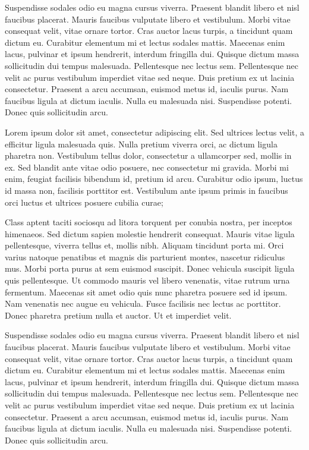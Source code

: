Suspendisse sodales odio eu magna cursus viverra. Praesent blandit libero et nisl faucibus placerat. Mauris faucibus vulputate libero et vestibulum. Morbi vitae consequat velit, vitae ornare tortor. Cras auctor lacus turpis, a tincidunt quam dictum eu. Curabitur elementum mi et lectus sodales mattis. Maecenas enim lacus, pulvinar et ipsum hendrerit, interdum fringilla dui. Quisque dictum massa sollicitudin dui tempus malesuada. Pellentesque nec lectus sem. Pellentesque nec velit ac purus vestibulum imperdiet vitae sed neque. Duis pretium ex ut lacinia consectetur. Praesent a arcu accumsan, euismod metus id, iaculis purus. Nam faucibus ligula at dictum iaculis. Nulla eu malesuada nisi. Suspendisse potenti. Donec quis sollicitudin arcu.

Lorem ipsum dolor sit amet, consectetur adipiscing elit. Sed ultrices lectus velit, a efficitur ligula malesuada quis. Nulla pretium viverra orci, ac dictum ligula pharetra non. Vestibulum tellus dolor, consectetur a ullamcorper sed, mollis in ex. Sed blandit ante vitae odio posuere, nec consectetur mi gravida. Morbi mi enim, feugiat facilisis bibendum id, pretium id arcu. Curabitur odio ipsum, luctus id massa non, facilisis porttitor est. Vestibulum ante ipsum primis in faucibus orci luctus et ultrices posuere cubilia curae;

Class aptent taciti sociosqu ad litora torquent per conubia nostra, per inceptos himenaeos. Sed dictum sapien molestie hendrerit consequat. Mauris vitae ligula pellentesque, viverra tellus et, mollis nibh. Aliquam tincidunt porta mi. Orci varius natoque penatibus et magnis dis parturient montes, nascetur ridiculus mus. Morbi porta purus at sem euismod suscipit. Donec vehicula suscipit ligula quis pellentesque. Ut commodo mauris vel libero venenatis, vitae rutrum urna fermentum. Maecenas sit amet odio quis nunc pharetra posuere sed id ipsum. Nam venenatis nec augue eu vehicula. Fusce facilisis nec lectus ac porttitor. Donec pharetra pretium nulla et auctor. Ut et imperdiet velit.

Suspendisse sodales odio eu magna cursus viverra. Praesent blandit libero et nisl faucibus placerat. Mauris faucibus vulputate libero et vestibulum. Morbi vitae consequat velit, vitae ornare tortor. Cras auctor lacus turpis, a tincidunt quam dictum eu. Curabitur elementum mi et lectus sodales mattis. Maecenas enim lacus, pulvinar et ipsum hendrerit, interdum fringilla dui. Quisque dictum massa sollicitudin dui tempus malesuada. Pellentesque nec lectus sem. Pellentesque nec velit ac purus vestibulum imperdiet vitae sed neque. Duis pretium ex ut lacinia consectetur. Praesent a arcu accumsan, euismod metus id, iaculis purus. Nam faucibus ligula at dictum iaculis. Nulla eu malesuada nisi. Suspendisse potenti. Donec quis sollicitudin arcu.

